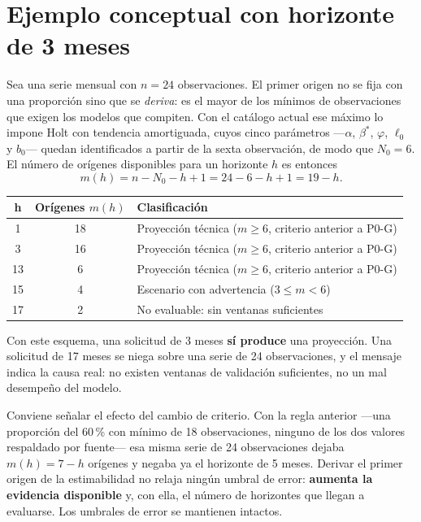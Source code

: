 \documentclass[11pt,letterpaper]{article}
\begin{document}
\section{Ejemplo conceptual con horizonte de 3 meses}

Sea una serie mensual con \(n=24\) observaciones. El primer origen no se fija
con una proporción sino que se \emph{deriva}: es el mayor de los mínimos de
observaciones que exigen los modelos que compiten. Con el catálogo actual ese
máximo lo impone Holt con tendencia amortiguada, cuyos cinco parámetros
---\(\alpha\), \(\beta^{*}\), \(\varphi\), \(\ell_0\) y \(b_0\)--- quedan
identificados a partir de la sexta observación, de modo que \(N_0=6\). El
número de orígenes disponibles para un horizonte \(h\) es entonces
\begin{equation}
m(h)=n-N_0-h+1=24-6-h+1=19-h .
\end{equation}

\begin{center}
\begin{tabular}{@{}ccl@{}}
\toprule
\textbf{h} & \textbf{Orígenes \(m(h)\)} & \textbf{Clasificación} \\
\midrule
1 & 18 & Proyección técnica (\(m\geq 6\), criterio anterior a P0-G) \\
3 & 16 & Proyección técnica (\(m\geq 6\), criterio anterior a P0-G) \\
13 & 6 & Proyección técnica (\(m\geq 6\), criterio anterior a P0-G) \\
15 & 4 & Escenario con advertencia (\(3\leq m<6\)) \\
17 & 2 & No evaluable: sin ventanas suficientes \\
\bottomrule
\end{tabular}
\end{center}

Con este esquema, una solicitud de 3 meses \textbf{sí produce} una proyección.
Una solicitud de 17 meses se niega sobre una serie de 24 observaciones, y el
mensaje indica la causa real: no existen ventanas de validación suficientes, no
un mal desempeño del modelo.

Conviene señalar el efecto del cambio de criterio. Con la regla anterior
---una proporción del 60\,\% con mínimo de 18 observaciones, ninguno de los dos
valores respaldado por fuente--- esa misma serie de 24 observaciones dejaba
\(m(h)=7-h\) orígenes y negaba ya el horizonte de 5 meses. Derivar el primer
origen de la estimabilidad no relaja ningún umbral de error: \textbf{aumenta la
evidencia disponible} y, con ella, el número de horizontes que llegan a
evaluarse. Los umbrales de error se mantienen intactos.
\end{document}
